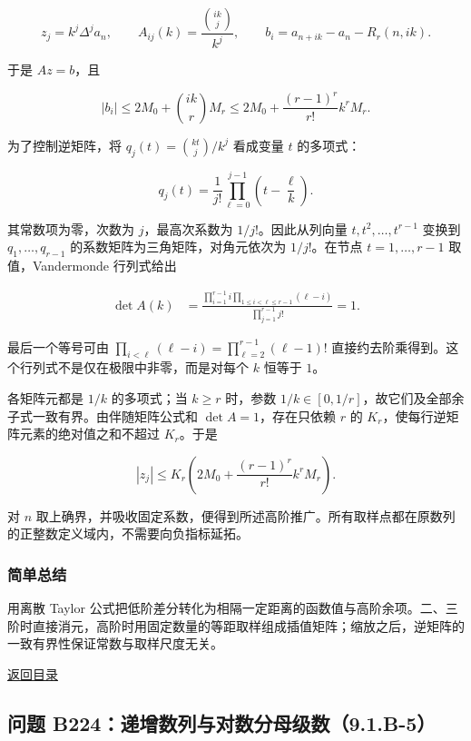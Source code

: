 \documentclass[11pt,a4paper]{article}
\begin{document}
\[
z_j=k^j\Delta^ja_n,\qquad
A_{ij}(k)=\frac{\binom{ik}{j}}{k^j},\qquad
b_i=a_{n+ik}-a_n-R_r(n,ik).
\]

于是 \(Az=b\)，且

\[
|b_i|\le2M_0+\binom{ik}{r}M_r
\le2M_0+\frac{(r-1)^r}{r!}k^rM_r.
\]

为了控制逆矩阵，将 \(q_j(t)=\binom{kt}{j}/k^j\) 看成变量 \(t\)
的多项式：

\[
q_j(t)=\frac1{j!}\prod_{\ell=0}^{j-1}\left(t-\frac\ell k\right).
\]

其常数项为零，次数为 \(j\)，最高次系数为 \(1/j!\)。因此从列向量
\(t,t^2,\ldots,t^{r-1}\) 变换到 \(q_1,\ldots,q_{r-1}\)
的系数矩阵为三角矩阵，对角元依次为 \(1/j!\)。在节点 \(t=1,\ldots,r-1\)
取值，Vandermonde 行列式给出

\[
\begin{aligned}
\det A(k)
&=\frac{\displaystyle\prod_{i=1}^{r-1}i
\prod_{1\le i<\ell\le r-1}(\ell-i)}
{\displaystyle\prod_{j=1}^{r-1}j!}=1.
\end{aligned}
\]

最后一个等号可由
\(\prod_{i<\ell}(\ell-i)=\prod_{\ell=2}^{r-1}(\ell-1)!\)
直接约去阶乘得到。这个行列式不是仅在极限中非零，而是对每个 \(k\) 恒等于
\(1\)。

各矩阵元都是 \(1/k\) 的多项式；当 \(k\ge r\) 时，参数
\(1/k\in[0,1/r]\)，故它们及全部余子式一致有界。由伴随矩阵公式和
\(\det A=1\)，存在只依赖 \(r\) 的
\(K_r\)，使每行逆矩阵元素的绝对值之和不超过 \(K_r\)。于是

\[
|z_j|\le K_r\left(2M_0+\frac{(r-1)^r}{r!}k^rM_r\right).
\]

对 \(n\)
取上确界，并吸收固定系数，便得到所述高阶推广。所有取样点都在原数列的正整数定义域内，不需要向负指标延拓。

\subsubsection{简单总结}\label{ux7b80ux5355ux603bux7ed3-26}

用离散 Taylor
公式把低阶差分转化为相隔一定距离的函数值与高阶余项。二、三阶时直接消元，高阶时用固定数量的等距取样组成插值矩阵；缩放之后，逆矩阵的一致有界性保证常数与取样尺度无关。

\noindent\hyperref[contents]{返回目录}

\subsection{问题
B224：递增数列与对数分母级数（9.1.B-5）}\label{ux95eeux9898-b224ux9012ux589eux6570ux5217ux4e0eux5bf9ux6570ux5206ux6bcdux7ea7ux65709.1.b-5}
\end{document}
